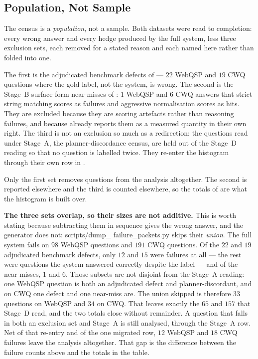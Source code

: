 \subsection{Population, Not Sample}

The census is a \emph{population}, not a sample. Both
datasets were read to completion: every wrong answer and every hedge produced by
the full system, less three exclusion sets, each removed for a stated reason and
each named here rather than folded into one.

The first is the adjudicated benchmark defects of  ---
$22$ WebQSP and $19$ CWQ questions where the gold label, not the system, is
wrong. The second is the Stage~B surface-form near-misses of :
$1$ WebQSP and $6$ CWQ answers that strict string matching scores as failures
and aggressive normalisation scores as hits. They are excluded because they are
scoring artefacts rather than reasoning failures, and because 
already reports them as a measured quantity in their own right. The third is not
an exclusion so much as a redirection: the questions read under Stage~A, the
planner-discordance census, are held out of the Stage~D reading so that no
question is labelled twice. They re-enter the histogram through their own
row in .

Only the first set removes questions from the analysis altogether. The second is
reported elsewhere and the third is counted elsewhere, so the totals of
 are what the histogram is built over.

\textbf{The three sets overlap, so their sizes are not additive.} This is worth
stating because subtracting them in sequence gives the wrong answer, and the
generator does not: \textsf{scripts/\allowbreak dump\_\allowbreak
failure\_\allowbreak packets.py} skips their \emph{union}. The full system fails
on $98$ WebQSP questions and $191$ CWQ questions. Of the $22$ and $19$
adjudicated benchmark defects, only $12$ and $15$ were failures at all --- the
rest were questions the system answered correctly despite the label --- and of
the near-misses, $1$ and $6$. Those subsets are not disjoint from the Stage~A
reading: one WebQSP question is both an adjudicated defect and
planner-discordant, and on CWQ one defect and one near-miss are. The union
skipped is therefore $33$ questions on WebQSP and $34$ on CWQ. That leaves
exactly the $65$ and $157$ that Stage~D read, and the two totals close without
remainder. A question that falls in both an exclusion set and Stage~A is still
analysed, through the Stage~A row. Net of that re-entry and of the one migrated
row, $12$ WebQSP and $18$ CWQ failures leave the analysis altogether. That gap
is the difference between the failure counts above and the totals in the table.

